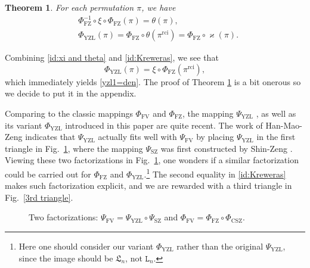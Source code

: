 \documentclass[12pt]{amsart}
\numberwithin{equation}{section}
\theoremstyle{plain}
\newtheorem{theorem}{Theorem}[section]
\theoremstyle{definition}
\def\FV{\mathrm{FV}}
\def\FZ{\mathrm{FZ}}
\def\YZL{\mathrm{YZL}}
\def\CSZ{\mathrm{CSZ}}
\def\SZ{\mathrm{SZ}}
\def\SS{\mathfrak{S}}
\def\rci{\mathrm{rci}}
\def\LH{\mathfrak{L}}
\begin{document}
\begin{theorem}\label{thm:yzl family}
For each permutation $\pi$, we have
\begin{align}\label{id:xi and theta}
&\Phi^{-1}_{\FZ}\circ \xi\circ \Phi_{\FZ}(\pi)=\theta(\pi),\\
&\Phi_{\YZL}(\pi)=\Phi_{\FZ}\circ\theta(\pi^{\rci})=\Phi_{\FZ}\circ\varkappa(\pi).
\label{id:Kreweras}
\end{align}





\end{theorem}
Combining \eqref{id:xi and theta} and \eqref{id:Kreweras}, we see that
$$\Phi_{\YZL}(\pi)=\xi\circ\Phi_{\FZ}(\pi^{\rci}),$$
which immediately yields \eqref{yzl1=den}. The proof of Theorem \ref{thm:yzl family} is a bit onerous so we decide to put it in the appendix.

Comparing to the classic mappings $\Phi_{\FV}$ and $\Phi_{\FZ}$, the mapping $\Psi_{\YZL}$ \cite{YZL}, as well as its variant $\Phi_{\YZL}$ introduced in this paper are quite recent. The work of Han-Mao-Zeng \cite{HMZ} indicates that $\Psi_{\YZL}$ actually fits well with $\Psi_{\FV}$ by placing $\Psi_{\YZL}$ in the first triangle in Fig.~\ref{two triangle}, where the mapping $\Psi_{\SZ}$ was first constructed by Shin-Zeng \cite{SZ12}. Viewing these two factorizations in Fig.~\ref{two triangle}, one wonders if a similar factorization could be carried out for $\Phi_{\FZ}$ and $\Phi_{\YZL}$.\footnote{Here one should consider our variant $\Phi_{\YZL}$ rather than the original $\Psi_{\YZL}$, since the image should be $\LH_n$, not $\mathtt{L}_n$.} The second equality in \eqref{id:Kreweras} makes such factorization explicit, and we are rewarded with a third triangle in Fig.~\ref{3rd triangle}.

\begin{figure}[htb]
\caption{Two factorizations: $\Psi_{\FV}=\Psi_{\YZL}\circ\Psi_{\SZ}$ and $\Phi_{\FV}=\Phi_{\FZ}\circ\Phi_{\CSZ}$. \label{two triangle}}
\end{figure}
\end{document}
